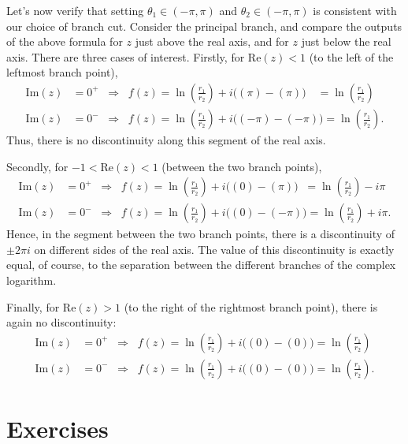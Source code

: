 \documentclass[10pt,a4paper]{article}
\begin{document}
Let's now verify that setting $\theta_1 \in (-\pi,\pi)$ and
$\theta_2 \in (-\pi,\pi)$ is consistent with our choice of branch cut.
Consider the principal branch, and compare the outputs of the above
formula for $z$ just above the real axis, and for $z$ just below the
real axis. There are three cases of interest. Firstly, for
$\mathrm{Re}(z) < 1$ (to the left of the leftmost branch point),
\begin{align}
  \mathrm{Im}(z) &= 0^+ \;\;\Rightarrow\;\;
  f(z) = \ln\left(\frac{r_1}{r_2}\right) + i\Big((\pi) - (\pi)\Big) \quad
  = \ln\left(\frac{r_1}{r_2}\right) \\
  \mathrm{Im}(z) &= 0^- \;\;\Rightarrow \;\;
  f(z) = \ln\left(\frac{r_1}{r_2}\right) + i\Big((-\pi) - (-\pi)\Big)
  = \ln\left(\frac{r_1}{r_2}\right).
\end{align}
Thus, there is no discontinuity along this segment of the real axis.

Secondly, for $-1 < \mathrm{Re}(z) < 1$ (between the two branch
points),
\begin{align}
  \mathrm{Im}(z) &= 0^+ \;\;\Rightarrow\;\; f(z)
  = \ln\left(\frac{r_1}{r_2}\right) + i\Big((0) - (\pi)\Big) \;\;
  = \ln\left(\frac{r_1}{r_2}\right) -i\pi \\
  \mathrm{Im}(z) &= 0^- \;\;\Rightarrow\;\;
  f(z) = \ln\left(\frac{r_1}{r_2}\right) + i\Big((0) - (-\pi)\Big)
  = \ln\left(\frac{r_1}{r_2}\right) + i\pi.
\end{align}
Hence, in the segment between the two branch points, there is a
discontinuity of $\pm 2\pi i$ on different sides of the real axis. The
value of this discontinuity is exactly equal, of course, to the
separation between the different branches of the complex logarithm.

Finally, for $\mathrm{Re}(z) > 1$ (to the right of the rightmost
branch point), there is again no discontinuity:
\begin{align}
  \mathrm{Im}(z) &= 0^+ \;\;\Rightarrow\;\; f(z)
  = \ln\left(\frac{r_1}{r_2}\right) + i\Big((0) - (0)\Big)
  = \ln\left(\frac{r_1}{r_2}\right) \\
  \mathrm{Im}(z) &= 0^- \;\;\Rightarrow\;\;
  f(z) = \ln\left(\frac{r_1}{r_2}\right) + i\Big((0) - (0)\Big)
  = \ln\left(\frac{r_1}{r_2}\right).
\end{align}

\section{Exercises}\label{exercises}
\end{document}
